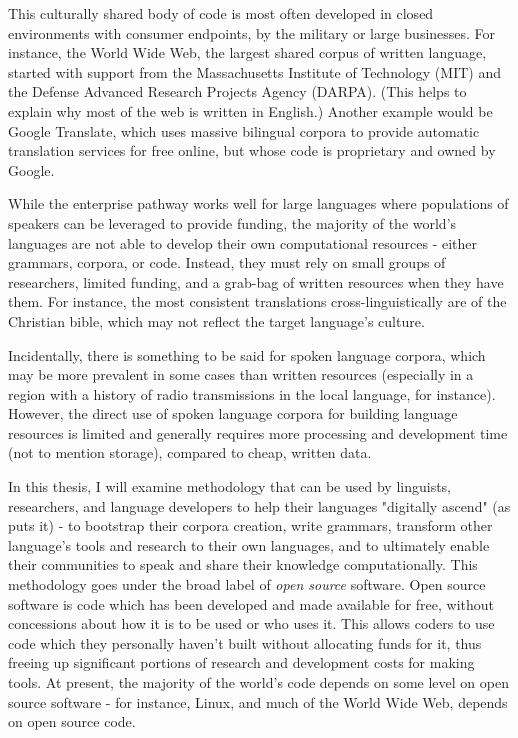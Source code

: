 This culturally shared body of code is most often developed in closed environments with consumer endpoints, by the military or large businesses. For instance, the World Wide Web, the largest shared corpus of written language, started with support from  the Massachusetts Institute of Technology (MIT) and the Defense Advanced Research Projects Agency (DARPA). (This helps to explain why most of the web is written in English.) Another example would be Google Translate, which uses massive bilingual corpora to provide automatic translation services for free online, but whose code is proprietary and owned by Google.

While the enterprise pathway works well for large languages where populations of speakers can be leveraged to provide funding, the majority of the world's languages are not able to develop their own computational resources - either grammars, corpora, or code. Instead, they must rely on small groups of researchers, limited funding, and a grab-bag of written resources when they have them. For instance, the most consistent translations cross-linguistically are of the Christian bible, which may not reflect the target language's culture.

Incidentally, there is something to be said for spoken language corpora, which may be more prevalent in some cases than written resources (especially in a region with a history of radio transmissions in the local language, for instance). However, the direct use of spoken language corpora for building language resources is limited and generally requires more processing and development time (not to mention storage), compared to cheap, written data.


In this thesis, I will examine methodology that can be used by linguists, researchers, and language developers to help their languages "digitally ascend" (as \citet{kornai2013digital} puts it) - to bootstrap their corpora creation, write grammars, transform other language's tools and research to their own languages, and to ultimately enable their communities to speak and share their knowledge computationally. This methodology goes under the broad label of \textit{open source} software. Open source software is code which has been developed and made available for free, without concessions about how it is to be used or who uses it. This allows coders to use code which they personally haven't built without allocating funds for it, thus freeing up significant portions of research and development costs for making tools. At present, the majority of the world's code depends on some level on open source software - for instance, Linux, and much of the World Wide Web, depends on open source code.

